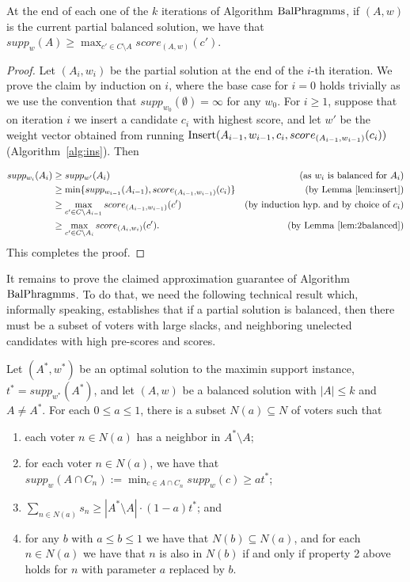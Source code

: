 \begin{lemma}\label{lem:315localoptimality}
At the end of each one of the $k$ iterations of Algorithm $\operatorname{BalPhragmms}$, if $(A,w)$ is the current partial balanced solution, we have that $supp_{w}(A)\geq \max_{c'\in C\setminus A} score_{(A,w)}(c')$.
\end{lemma}
\begin{proof}
Let $(A_i,w_i)$ be the partial solution at the end of the $i$-th iteration. We prove the claim by induction on $i$, where the base case for $i=0$ holds trivially as we use the convention that $supp_{w_0}(\emptyset)=\infty$ for any $w_0$. For $i\geq 1$, suppose that on iteration $i$ we insert a candidate $c_i$ with highest score, and let $w'$ be the weight vector obtained from running $\operatorname{Insert}(A_{i-1}, w_{i-1}, c_i, score_{(A_{i-1}, w_{i-1})}(c_i))$ (Algorithm~\ref{alg:ins}). Then

\begin{align*}
supp_{w_i}(A_i) &\geq supp_{w'}(A_i) &\text{(as $w_i$ is balanced for $A_i$)}\\
&\geq \min\{ supp_{w_{i-1}}(A_{i-1}), score_{(A_{i-1}, w_{i-1})}(c_i) \} &\text{(by Lemma~\ref{lem:insert})}\\
&\geq \max_{c'\in C\setminus A_{i-1}} score_{(A_{i-1}, w_{i-1})}(c') &\text{(by induction hyp.~and by choice of $c_i$)}\\
&\geq \max_{c'\in C\setminus A_{i}} score_{(A_{i}, w_{i})}(c'). &\text{(by Lemma~\ref{lem:2balanced})}
\end{align*}
This completes the proof.
\end{proof}


It remains to prove the claimed approximation guarantee of Algorithm $\operatorname{BalPhragmms}$. 
To do that, we need the following technical result which, informally speaking, establishes that if a partial solution is balanced, then there must be a subset of voters with large slacks, and neighboring unelected candidates with high pre-scores and scores.   

\begin{lemma}\label{lem:N_a}
Let $(A^*, w^*)$ be an optimal solution to the maximin support instance, $t^*=supp_{w^*}(A^*)$, and let $(A,w)$ be a balanced solution with $|A|\leq k$ and $A\neq A^*$. For each $0\leq a\leq 1$, there is a subset $N(a)\subseteq N$ of voters such that 
\begin{enumerate}
	\item each voter $n\in N(a)$ has a neighbor in $A^*\setminus A$;
	\item for each voter $n\in N(a)$, we have that $supp_w(A\cap C_n):=\min_{c\in A\cap C_n} supp_w(c)\geq at^*$;
	\item $\sum_{n\in N(a)} s_n \geq |A^* \setminus A|\cdot (1-a) t^*$; and
	\item for any $b$ with $a\leq b\leq 1$ we have that $N(b)\subseteq N(a)$, and for each $n\in N(a)$ we have that $n$ is also in $N(b)$ if and only if property 2 above holds for $n$ with parameter $a$ replaced by $b$.
\end{enumerate}
\end{lemma}

